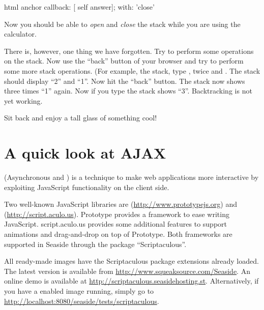 \documentclass[a4paper,10pt,twoside]{book}
\begin{document}

\begin{code}{}
html anchor
	callback: [ self answer];
	with: 'close'
\end{code}

Now you should be able to \emph{open} and \emph{close} the stack while you are using the calculator.

There is, however, one thing we have forgotten.
Try to perform some operations on the stack.
Now use the ``back'' button of your browser and try to perform some more stack operations.
(For example,  the stack, type ,  twice and \menu {+}.
The stack should display ``2'' and ``1''.
Now hit the ``back'' button.
The stack now shows three times ``1'' again.
Now if you type \menu{+} the stack shows ``3''.
Backtracking is not yet working.


Sit back and enjoy a tall glass of something cool!

\section{A quick look at AJAX}


 (Asynchronous  and ) is a technique to make web applications more interactive by exploiting JavaScript functionality on the client side.

Two well-known JavaScript libraries are  (\url{http://www.prototypejs.org}) and  (\url{http://script.aculo.us}).
Prototype provides a framework to ease writing JavaScript.
script.aculo.us provides some additional features to support animations and drag-and-drop on top of Prototype.
Both frameworks are supported in Seaside through the package ``Scriptaculous''.

All ready-made images have the Scriptaculous package extensions already loaded.
The latest version is available from \url{http://www.squeaksource.com/Seaside}.
An online demo is available at \url{http://scriptaculous.seasidehosting.st}.
Alternatively, if you have a enabled image running, simply go to \url{http://localhost:8080/seaside/tests/scriptaculous}.
\end{document}
